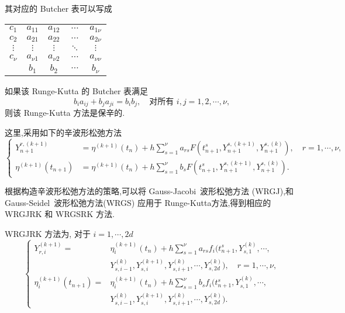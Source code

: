 其对应的 Butcher 表可以写成

\begin{center}
  \begin{tabular}{c|cccc}
    $c_1$&$a_{11}$&$a_{12}$&$\cdots$&$a_{1\nu}$\\
    $c_2$&$a_{21}$&$a_{22}$&$\cdots$&$a_{2\nu}$\\
    $\vdots$&$\vdots$&$\vdots$&$\ddots$&$\vdots$\\
    $c_{\nu}$&$a_{\nu 1}$&$a_{\nu 2}$&$\cdots$&$a_{\nu \nu}$\\
    \hline
         &$b_{1}$&$b_{2}$&$\cdots$&$b_{\nu}$
  \end{tabular}
\end{center}

如果该 Runge-Kutta 的 Butcher 表满足
\begin{equation*}
  b_ia_{ij}+b_ja_{ji}=b_ib_j,\quad \textrm{对所有}\,\, i,j=1,2,\cdots,\nu,
\end{equation*}
则该 Runge-Kutta 方法是保辛的.

这里,采用如下的辛波形松弛方法 \cite{bellen1993use}
\begin{equation*}
  \left\lbrace
    \begin{aligned}
      Y_{n+1}^{r,(k+1)}&=\eta^{(k+1)}(t_{n})+h\sum_{s=1}^{\nu}a_{rs}F(t_{n+1}^{s},Y_{n+1}^{s,(k+1)},Y_{n+1}^{s,(k)}),\quad r=1,\cdots, \nu, \\
      \eta^{(k+1)}(t_{n+1})&=\eta^{(k+1)}(t_{n})+h\sum_{s=1}^{\nu}b_{s}F(t_{n+1}^{s},Y_{n+1}^{s,(k+1)},Y_{n+1}^{s,(k)}).
    \end{aligned}
  \right.
\end{equation*}

根据构造辛波形松弛方法的策略,可以将 Gauss-Jacobi~波形松弛方法 (WRGJ),和 Gauss-Seidel~波形松弛方法(WRGS) 应用于 Runge-Kutta方法,得到相应的 WRGJRK 和 WRGSRK 方法.

WRGJRK 方法为, 对于 $i=1,\cdots,2d$
\begin{equation*}
  \left\lbrace
    \begin{aligned}
      Y_{r,i}^{(k+1)}=&\eta_{i}^{(k+1)}(t_{n})+h\sum_{s=1}^{\nu}a_{rs}f_i(t_{n+1}^{s},Y_{s,1}^{(k)},\cdots,\\
      &Y_{s,i-1}^{(k)},Y_{s,i}^{(k+1)},Y_{s,i+1}^{(k)},\cdots,Y_{s,2d}^{(k)}),\quad r=1,\cdots, \nu, \\
      \eta_{i}^{(k+1)}(t_{n+1})=&\eta_{i}^{(k+1)}(t_{n})+h\sum_{s=1}^{\nu}b_{s}f_i(t_{n+1}^{s},Y_{s,1}^{(k)},\cdots,\\
      &Y_{s,i-1}^{(k)},Y_{s,i}^{(k+1)},Y_{s,i+1}^{(k)},\cdots,Y_{s,2d}^{(k)}).
    \end{aligned}
  \right.
\end{equation*}


